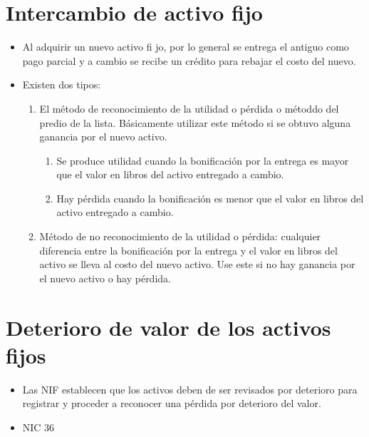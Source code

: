 \documentclass{article}
\begin{document}
\section{Intercambio de activo fijo}
\begin{itemize}
    \item Al adquirir un nuevo activo fi jo, por lo general se entrega el antiguo como pago parcial y a cambio se recibe un crédito para rebajar el costo del nuevo. 
    \item Existen dos tipos:
        \begin{enumerate}
            \item El método de reconocimiento de la utilidad o pérdida o métoddo del predio de la lista. Básicamente utilizar este método si se obtuvo alguna ganancia por el nuevo activo.
                \begin{enumerate}
                    \item Se produce utilidad cuando la bonificación por la entrega es mayor que el valor en libros del activo entregado a cambio.
                    \item Hay pérdida cuando la bonificación es menor que el valor en libros del activo entregado a cambio.
                \end{enumerate}
            
            \item Método de no reconocimiento de la utilidad o pérdida: cualquier diferencia entre la bonificación por la entrega y el valor en libros del activo se lleva al costo del nuevo activo. Use este si no hay ganancia por el nuevo activo o hay pérdida.
        \end{enumerate}
\end{itemize}

\section{Deterioro de valor de los activos fijos}
\begin{itemize}
    \item Las NIF establecen que los activos deben de ser revisados por deterioro para registrar y proceder a reconocer una pérdida por deterioro del valor. 
    \item NIC 36
\end{itemize}
\end{document}
